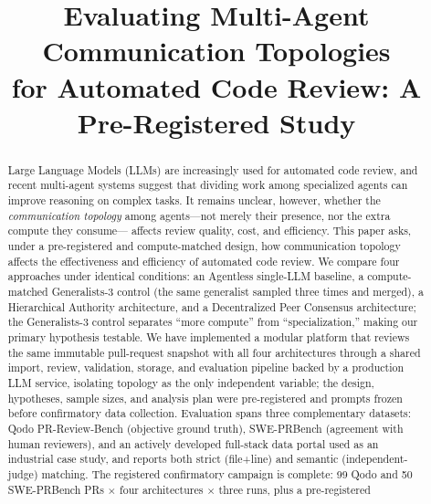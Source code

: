 \documentclass[conference]{IEEEtran}
\begin{document}
\title{Evaluating Multi-Agent Communication Topologies\\
for Automated Code Review: A Pre-Registered Study}

\author{
}

\maketitle

\begin{abstract}
Large Language Models (LLMs) are increasingly used for automated code
review, and recent multi-agent systems suggest that dividing work among
specialized agents can improve reasoning on complex tasks. It remains
unclear, however, whether the \emph{communication topology} among
agents---not merely their presence, nor the extra compute they consume---
affects review quality, cost, and efficiency. This paper asks, under a
pre-registered and compute-matched design, how communication topology
affects the effectiveness and efficiency of automated code review. We compare four approaches under identical
conditions: an Agentless single-LLM baseline, a compute-matched
Generalists-3 control (the same generalist sampled three times and merged),
a Hierarchical Authority architecture, and a Decentralized Peer Consensus
architecture; the Generalists-3 control separates ``more compute'' from
``specialization,'' making our primary hypothesis testable. We have
implemented a modular platform that reviews the same immutable pull-request
snapshot with all four architectures through a shared import, review,
validation, storage, and evaluation pipeline backed by a production LLM
service, isolating topology as the only independent variable; the design,
hypotheses, sample sizes, and analysis plan were pre-registered and prompts
frozen before confirmatory data collection. Evaluation spans three
complementary datasets: Qodo PR-Review-Bench (objective ground truth),
SWE-PRBench (agreement with human reviewers), and an actively developed
full-stack data portal used as an industrial case study, and reports both
strict (file+line) and semantic (independent-judge) matching. The
registered confirmatory campaign is complete: 99 Qodo and 50 SWE-PRBench
PRs $\times$ four architectures $\times$ three runs, plus a pre-registered

\end{abstract}
\end{document}
